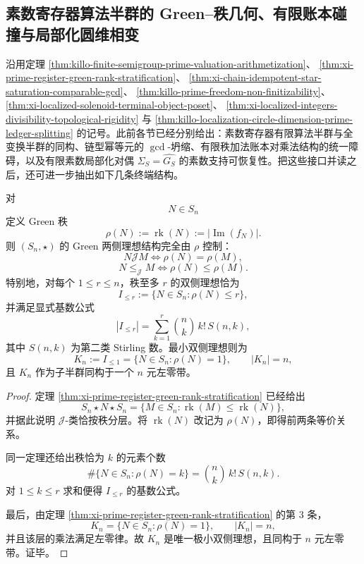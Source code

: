 \subsection{素数寄存器算法半群的 Green--秩几何、有限账本碰撞与局部化圆维相变}\label{subsec:conclusion-prime-register-green-localization-cdim-phase-transition}
沿用定理 \ref{thm:killo-finite-semigroup-prime-valuation-arithmetization}、
\ref{thm:xi-prime-register-green-rank-stratification}、
\ref{thm:xi-chain-idempotent-star-saturation-comparable-gcd}、
\ref{thm:killo-prime-freedom-non-finitizability}、
\ref{thm:xi-localized-solenoid-terminal-object-poset}、
\ref{thm:xi-localized-integers-divisibility-topological-rigidity}
与
\ref{thm:killo-localization-circle-dimension-prime-ledger-splitting}
的记号。此前各节已经分别给出：素数寄存器有限算法半群与全变换半群的同构、链型幂等元的 \(\gcd\)-坍缩、有限秩加法账本对乘法结构的统一障碍，以及有限素数局部化对偶 \(\Sigma_S=\widehat{G_S}\) 的素数支持可恢复性。把这些接口并读之后，还可进一步抽出如下几条终端结构。

\begin{theorem}\label{thm:conclusion-prime-register-green-rank-geometry-complete}
对
\[
N\in S_n
\]
定义 Green 秩
\[
\rho(N):=\operatorname{rk}(N):=\bigl|\operatorname{Im}(f_N)\bigr|.
\]
则 \((S_n,\star)\) 的 Green 两侧理想结构完全由 \(\rho\) 控制：
\[
N\mathrel{\mathcal J}M
\iff
\rho(N)=\rho(M),
\]
\[
N\le_{\mathcal J}M
\iff
\rho(N)\le \rho(M).
\]
特别地，对每个 \(1\le r\le n\)，秩至多 \(r\) 的双侧理想恰为
\[
I_{\le r}:=\{N\in S_n:\rho(N)\le r\},
\]
并满足显式基数公式
\[
|I_{\le r}|
=
\sum_{k=1}^{r}\binom{n}{k}\,k!\,S(n,k),
\]
其中 \(S(n,k)\) 为第二类 Stirling 数。最小双侧理想则为
\[
K_n:=I_{\le 1}=\{N\in S_n:\rho(N)=1\},
\qquad
|K_n|=n,
\]
且 \(K_n\) 作为子半群同构于一个 \(n\) 元左零带。
\end{theorem}
\begin{proof}
定理 \ref{thm:xi-prime-register-green-rank-stratification} 已经给出
\[
S_n\star N\star S_n
=
\{M\in S_n:\operatorname{rk}(M)\le \operatorname{rk}(N)\},
\]
并据此说明 \(\mathcal J\)-类恰按秩分层。将 \(\operatorname{rk}(N)\) 改记为 \(\rho(N)\)，即得前两条等价关系。

同一定理还给出秩恰为 \(k\) 的元素个数
\[
\#\{N\in S_n:\rho(N)=k\}
=
\binom{n}{k}\,k!\,S(n,k).
\]
对 \(1\le k\le r\) 求和便得 \(I_{\le r}\) 的基数公式。

最后，由定理 \ref{thm:xi-prime-register-green-rank-stratification} 的第 \(3\) 条，
\[
K_n
=
\{N\in S_n:\rho(N)=1\},
\qquad
|K_n|=n,
\]
并且该层的乘法满足左零律。故 \(K_n\) 是唯一极小双侧理想，且同构于 \(n\) 元左零带。证毕。
\end{proof}


